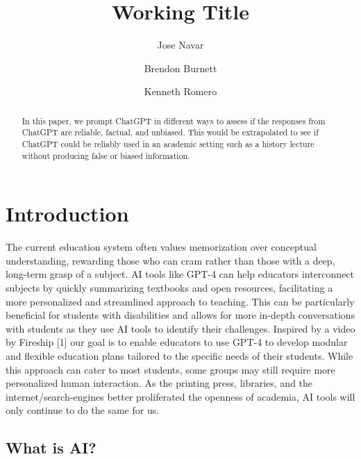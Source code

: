 \documentclass[letterpaper, 10pt, conference]{ieeeconf}
\title{\LARGE \bf
Working Title
}
\author[1]{Jose Navar}
\author[2]{Brendon Burnett}
\author[3]{Kenneth Romero}
\affil[1,2,3]{\emph{University of North Georgia}}
\begin{document}
    \maketitle
    \begin{abstract}
    In this paper, we prompt ChatGPT in different ways to assess if the responses from ChatGPT are reliable, factual, and
    unbiased. This would be extrapolated to see if ChatGPT could be reliably used in an academic setting such as a history lecture
    without producing false or biased information. 
    \end{abstract}

    \section{Introduction}
    The current education system often values memorization over conceptual understanding, rewarding those who can cram rather than those with a deep, long-term grasp of a subject. AI tools like GPT-4 can help educators interconnect subjects by quickly summarizing textbooks and open resources, facilitating a more personalized and streamlined approach to teaching. This can be particularly beneficial for students with disabilities and allows for more in-depth conversations with students as they use AI tools to identify their challenges. Inspired by a video by Fireship [1] our goal is to enable educators to use GPT-4 to develop modular and flexible education plans tailored to the specific needs of their students. While this approach can cater to most students, some groups may still require more personalized human interaction. As the printing press, libraries, and the internet/search-engines better proliferated the openness of academia, AI tools will only continue to do the same for us.

    \subsection{What is AI?}
    
    
\end{document}
